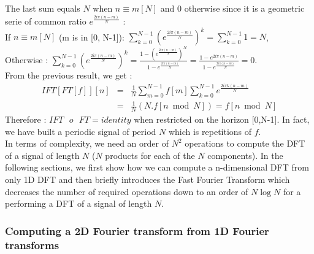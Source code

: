 \documentclass[a4paper,10pt,twoside]{article}
\begin{document}
The last sum equals $N$ when $n \equiv m[N]$ and $0$ otherwise since it is a geometric serie of common ratio $e^{\frac{2i\pi (n-m)}{N}}$ : \\
If $n \equiv m [N]$ (m is in [0, N-1]): $\sum_{k=0}^{N-1} (e^{\frac{2i\pi (n-m)}{N}})^k = \sum_{k=0}^{N-1} 1 = N$,\\
Otherwise : $\sum_{k=0}^{N-1} (e^{\frac{2i\pi (n-m)}{N}})^k = \frac{1 - (e^{\frac{2i\pi (n-m)}{N}})^N}{1 - e^{\frac{2i\pi (n-m)}{N}}} =  \frac{1 - e^{2i\pi (n-m)} }{1 - e^{\frac{2i\pi (n-m)}{N}}} = 0$.\\
From the previous result, we get : \\
\begin{eqnarray}
\nonumber IFT[FT[f]][n] &=& \frac{1}{N} \sum_{m=0}^{N-1} f[m] \sum_{k=0}^{N-1} e^{\frac{2i\pi k (n-m)}{N}}\\
\nonumber              &=& \frac{1}{N} (N . f[n \bmod N]) = f[n \bmod N]
\end{eqnarray}
Therefore : $IFT\mbox{ }o\mbox{ }FT = identity$ when restricted on the horizon [0,N-1]. In fact, we have built a periodic signal of period $N$ which is repetitions of $f$.\\

In terms of complexity, we need an order of $N^2$ operations to compute the DFT of a signal of length $N$ ($N$ products for each of the $N$ components). In the following sections, we first show how we can compute a n-dimensional DFT from only 1D DFT and then briefly introduces the Fast Fourier Transform which decreases the number of required operations down to an order of $N \log N$ for a performing a DFT of a signal of length $N$.

\subsubsection{Computing a 2D Fourier transform from 1D Fourier transforms}
\end{document}

